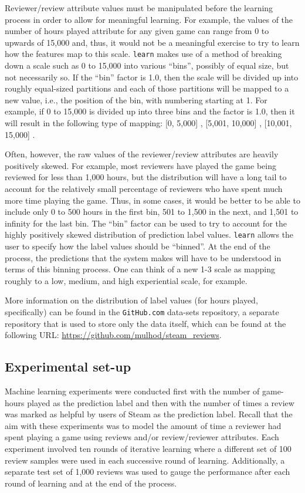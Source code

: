 \documentclass[9pt]{article}
\begin{document}
Reviewer/review attribute values must be manipulated before the learning process in order to allow for meaningful learning. For example, the values of the number of hours played attribute for any given game can range from 0 to upwards of 15,000 and, thus, it would not be a meaningful exercise to try to learn how the features map to this scale. {\tt learn} makes use of a method of breaking down a scale such as 0 to 15,000 into various ``bins'', possibly of equal size, but not necessarily so. If the ``bin'' factor is 1.0, then the scale will be divided up into roughly equal-sized partitions and each of those partitions will be mapped to a new value, i.e., the position of the bin, with numbering starting at 1. For example, if 0 to 15,000 is divided up into three bins and the factor is 1.0, then it will result in the following type of mapping: [0, 5,000] , [5,001, 10,000] , [10,001, 15,000] .

Often, however, the raw values of the reviewer/review attributes are heavily positively skewed. For example, most reviewers have played the game being reviewed for less than 1,000 hours, but the distribution will have a long tail to account for the relatively small percentage of reviewers who have spent much more time playing the game. Thus, in some cases, it would be better to be able to include only 0 to 500 hours in the first bin, 501 to 1,500 in the next, and 1,501 to infinity for the last bin. The ``bin'' factor can be used to try to account for the highly positively skewed distribution of prediction label values. {\tt learn} allows the user to specify how the label values should be ``binned''. At the end of the process, the predictions that the system makes will have to be understood in terms of this binning process. One can think of a new 1-3 scale as mapping roughly to a low, medium, and high experiential scale, for example.

More information on the distribution of label values (for hours played, specifically) can be found in the {\tt GitHub.com} data-sets repository, a separate repository that is used to store only the data itself, which can be found at the following URL: \url{https://github.com/mulhod/steam_reviews}.

\subsection{Experimental set-up}
\label{ssec:experimental_setup}

Machine learning experiments were conducted first with the number of game-hours played as the prediction label and then with the number of times a review was marked as helpful by users of Steam as the prediction label. Recall that the aim with these experiments was to model the amount of time a reviewer had spent playing a game using reviews and/or review/reviewer attributes. Each experiment involved ten rounds of iterative learning where a different set of 100 review samples were used in each successive round of learning. Additionally, a separate test set of 1,000 reviews was used to gauge the performance after each round of learning and at the end of the process.
\end{document}
